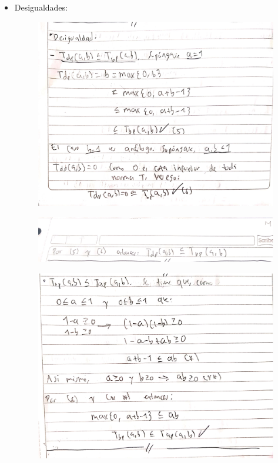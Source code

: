 \documentclass[fleqn]{article}
\begin{document}
\begin{enumerate}
\begin{itemize}
\begin{figure}[H]
       \end{figure}
       \item Desigualdades:
       \begin{figure}[H]
         \centering
         \includegraphics[scale=.5]{figs/2c1}
       \end{figure}
       \begin{figure}[H]
         \centering
         \includegraphics[scale=.5]{figs/2c2}
       \end{figure}
       \begin{figure}[H]
         \centering
         \includegraphics[scale=.5]{figs/2c3}

\end{figure}
\end{itemize}
\end{enumerate}
\end{document}
